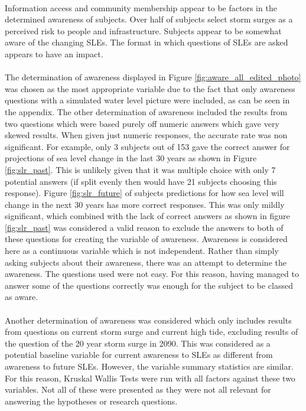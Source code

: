 \paragraph{}
Information access and community membership appear to be factors in the determined awareness of subjects. Over half of subjects select storm surges as a perceived risk to people and infrastructure. Subjects appear to be somewhat aware of the changing SLEs. The format in which questions of SLEs are asked appears to have an impact. 

\paragraph{}
The determination of awareness displayed in Figure \ref{fig:aware_all_edited_photo} was chosen as the most appropriate variable due to the fact that only awareness questions with a simulated water level picture were included, as can be seen in the appendix. The other determination of awareness included the results from two questions which were based purely off numeric answers which gave very skewed results. When given just numeric responses, the accurate rate was non significant. For example, only 3 subjects out of 153 gave the correct answer for projections of sea level change in the last 30 years as shown in Figure \ref{fig:slr_past}.  This is unlikely given that it was multiple choice with only 7 potential answers (if split evenly then would have 21 subjects choosing this response). Figure \ref{fig:slr_future} of subjects predictions for how sea level will change in the next 30 years has more correct responses. This was only mildly significant, which combined with the lack of correct answers as shown in figure \ref{fig:slr_past} was considered a valid reason to exclude the answers to both of these questions for creating the variable of awareness. Awareness is considered here as a continuous variable which is not independent. Rather than simply asking subjects about their awareness, there was an attempt to determine the awareness. The questions used were not easy. For this reason, having managed to answer some of the questions correctly was enough for the subject to be classed as aware.

\paragraph{}
Another determination of awareness was considered which only includes results from questions on current storm surge and current high tide, excluding results of the question of the 20 year storm surge in 2090. This was considered as a potential baseline variable for current awareness to SLEs as different from awareness to future SLEs. However, the variable summary statistics are similar. For this reason, Kruskal Wallis Tests were run with all factors against these two variables. Not all of these were presented as they were not all relevant for answering the hypotheses or research questions. 

